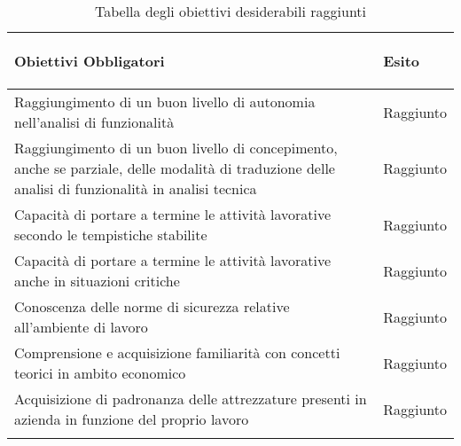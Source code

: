 	\begin{center}
		  \bgroup
		  \def\arraystretch{1.4}
		   \begin{longtable}{ | p{9cm} | p{2cm} | }  \hline
		   \label{TabellaObiettiviDesiderabiliRaggiunti}
			 
			 \cellcolor[gray]{0.9} \textbf{Obiettivi Obbligatori} & \cellcolor[gray]{0.9} \textbf{Esito} \\ \hline
						 
			Raggiungimento di un buon livello di autonomia nell'analisi di funzionalità & Raggiunto  \\ \hline
			Raggiungimento di un buon livello di concepimento, anche se parziale, delle modalità di traduzione delle analisi di funzionalità in analisi tecnica & Raggiunto \\ \hline
			Capacità di portare a termine le attività lavorative secondo le tempistiche stabilite & Raggiunto \\ \hline
			Capacità di portare a termine le attività lavorative anche in situazioni critiche & Raggiunto \\ \hline
			Conoscenza delle norme di sicurezza relative all'ambiente di lavoro & Raggiunto \\ \hline
			Comprensione e acquisizione familiarità con concetti teorici in ambito economico & Raggiunto  \\ \hline
			Acquisizione di padronanza delle attrezzature presenti in azienda in funzione del proprio lavoro & Raggiunto \\ \hline
			
			\caption{Tabella degli obiettivi desiderabili raggiunti}
			
		    \end{longtable}
		  \egroup
		\end{center}



